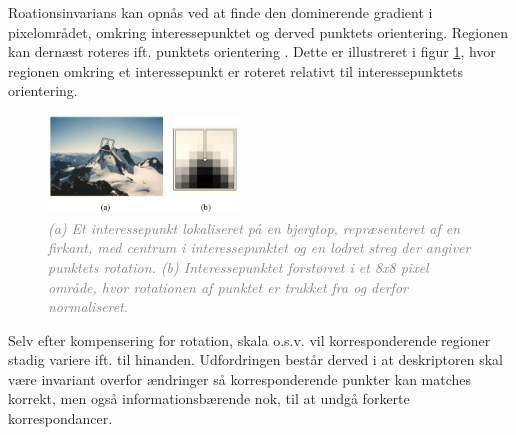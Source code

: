 Roationsinvarians kan opnås ved at finde den dominerende gradient i pixelområdet, omkring interessepunktet og derved punktets orientering. Regionen kan dernæst roteres ift. punktets orientering \cite{bjerg}. Dette er illustreret i figur \ref{fig:bjerg}, hvor regionen omkring et interessepunkt er roteret relativt til interessepunktets orientering.
\begin{figure}[H]
    \centering
    \includegraphics[width=0.45\textwidth]{fig/21.png}
    \vspace{-0.5em} 
    \begin{center}
    \caption{\textcolor{gray}{\footnotesize \textit{
   (a) Et interessepunkt lokaliseret på en bjergtop,  repræsenteret af en firkant, med centrum i interessepunktet og en lodret streg der angiver punktets rotation. (b) Interessepunktet forstørret i et 8x8 pixel område, hvor rotationen af punktet er trukket fra og derfor normaliseret.}}}
    \label{fig:bjerg}
     \end{center}
  \end{figure}
       \vspace{-2.5em}
\noindent
Selv efter kompensering for rotation, skala o.s.v. vil korresponderende regioner stadig variere ift. til hinanden. Udfordringen består derved i at deskriptoren skal være invariant overfor ændringer så korresponderende punkter kan matches korrekt, men også informationsbærende nok, til at undgå forkerte korrespondancer.
